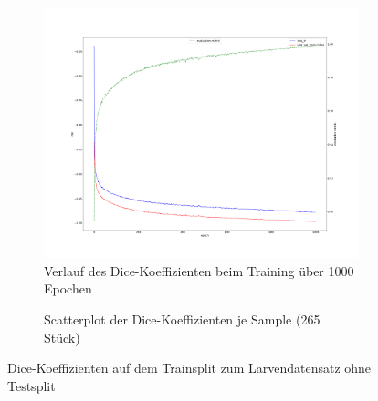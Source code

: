 \begin{figure}[H]
\centering
\begin{minipage}{.6\textwidth}
\begin{subfigure}{\textwidth}
\centering
\includegraphics[width=\textwidth]{Pictures/nnUnet/Praxis/Task200-Larven-nur-train/progress_200-Larven-nur-train.png}
\caption{Verlauf des Dice-Koeffizienten beim Training über 1000 Epochen}
\label{pic:Prog_200}
\end{subfigure}
\end{minipage}%
\begin{minipage}{.4\textwidth}
\begin{subfigure}{\textwidth}

\caption{Scatterplot der Dice-Koeffizienten je Sample (265 Stück)}
\label{pic:Dice_200}

\end{subfigure}
\end{minipage}
\caption{Dice-Koeffizienten auf dem Trainsplit zum Larvendatensatz ohne Testsplit}
\end{figure}

